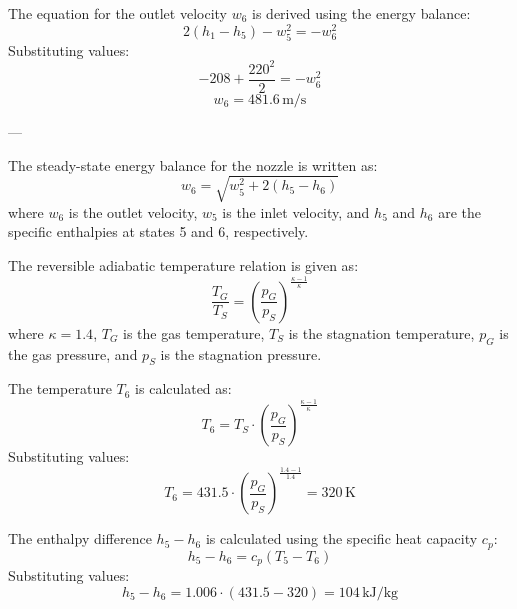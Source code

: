 The equation for the outlet velocity \( w_6 \) is derived using the energy balance:  
\[
2(h_1 - h_5) - w_5^2 = -w_6^2
\]  
Substituting values:  
\[
-208 + \frac{220^2}{2} = -w_6^2
\]  
\[
w_6 = 481.6 \, \text{m/s}
\]  

---

The steady-state energy balance for the nozzle is written as:  
\[
w_6 = \sqrt{w_5^2 + 2(h_5 - h_6)}
\]  
where \( w_6 \) is the outlet velocity, \( w_5 \) is the inlet velocity, and \( h_5 \) and \( h_6 \) are the specific enthalpies at states 5 and 6, respectively.  

The reversible adiabatic temperature relation is given as:  
\[
\frac{T_G}{T_S} = \left( \frac{p_G}{p_S} \right)^{\frac{\kappa - 1}{\kappa}}
\]  
where \( \kappa = 1.4 \), \( T_G \) is the gas temperature, \( T_S \) is the stagnation temperature, \( p_G \) is the gas pressure, and \( p_S \) is the stagnation pressure.  

The temperature \( T_6 \) is calculated as:  
\[
T_6 = T_S \cdot \left( \frac{p_G}{p_S} \right)^{\frac{\kappa - 1}{\kappa}}
\]  
Substituting values:  
\[
T_6 = 431.5 \cdot \left( \frac{p_G}{p_S} \right)^{\frac{1.4 - 1}{1.4}} = 320 \, \text{K}
\]  

The enthalpy difference \( h_5 - h_6 \) is calculated using the specific heat capacity \( c_p \):  
\[
h_5 - h_6 = c_p (T_5 - T_6)
\]  
Substituting values:  
\[
h_5 - h_6 = 1.006 \cdot (431.5 - 320) = 104 \, \text{kJ/kg}
\]